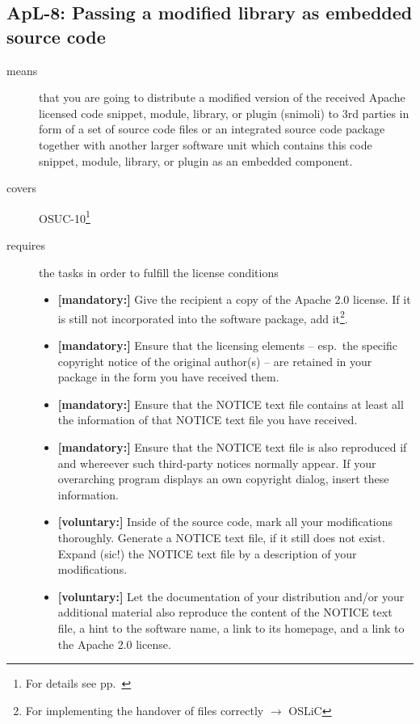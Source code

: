 \subsection{ApL-8: Passing a modified library as embedded source code}
\label{OSUC-10-Apache20}

\begin{description}
\item[means] that you are going to distribute a modified version of the received
Apache licensed code snippet, module, library, or plugin (snimoli) to 3rd
parties in form of a set of source code files or an integrated source code
package together with another larger software unit which contains this code
snippet, module, library, or plugin as an embedded component.
\item[covers] OSUC-10\footnote{For details see pp.\ \pageref{OSUC-10-DEF}}
\item[requires] the tasks in order to fulfill the license conditions
\begin{itemize}
  
  \item \textbf{[mandatory:]} Give the recipient a copy of the Apache 2.0
  license. If it is still not incorporated into the software package, add
  it\footnote{For implementing the handover of files correctly $\rightarrow$
  OSLiC \pageref{DistributingFilesHint}}.

  \item \textbf{[mandatory:]} Ensure that the licensing elements -- esp.\ the
  specific copyright notice of the original author(s) -- are retained in your
  package in the form you have received them.
  
  \item \textbf{[mandatory:]} Ensure that the NOTICE text file contains at least
  all the information of that NOTICE text file you have received.
 
  \item \textbf{[mandatory:]} Ensure that the NOTICE text file is also
  reproduced if and whereever such third-party notices normally appear. If your
  overarching program displays an own copyright dialog, insert these
  information.
 
  \item \textbf{[voluntary:]} Inside of the source code, mark all your
  modifications thoroughly. Generate a NOTICE text file, if it still does not
  exist. Expand (sic!) the NOTICE text file by a description of your
  modifications.
  
  \item \textbf{[voluntary:]} Let the documentation of your distribution
  and/or your additional material also reproduce the content of the NOTICE text
  file, a hint to the software name, a link to its homepage, and a link to the
  Apache 2.0 license.


\end{itemize}
\end{description}
